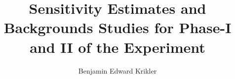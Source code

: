 \documentclass{thesis}
\title{Sensitivity Estimates and Backgrounds Studies for Phase-I and II of the \COMET Experiment}
\author{Benjamin Edward Krikler}
\begin{document}
\begin{frontmatter}
  
\end{frontmatter}

\begin{mainmatter}










\end{mainmatter}

%  

\begin{backmatter}
  
\end{backmatter}



\end{document}
